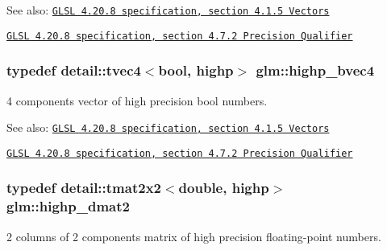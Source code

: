 \begin{Desc}
\item[See also:]\href{http://www.opengl.org/registry/doc/GLSLangSpec.4.20.8.pdf}{\tt GLSL 4.20.8 specification, section 4.1.5 Vectors} 

\href{http://www.opengl.org/registry/doc/GLSLangSpec.4.20.8.pdf}{\tt GLSL 4.20.8 specification, section 4.7.2 Precision Qualifier} \end{Desc}
\hypertarget{group__core__precision_g381539af52c5e5c659700e12fb706eaf}{
\subsubsection[highp\_\-bvec4]{\setlength{\rightskip}{0pt plus 5cm}typedef detail::tvec4$<$bool, highp$>$ {\bf glm::highp\_\-bvec4}}}
\label{group__core__precision_g381539af52c5e5c659700e12fb706eaf}


4 components vector of high precision bool numbers.

\begin{Desc}
\item[See also:]\href{http://www.opengl.org/registry/doc/GLSLangSpec.4.20.8.pdf}{\tt GLSL 4.20.8 specification, section 4.1.5 Vectors} 

\href{http://www.opengl.org/registry/doc/GLSLangSpec.4.20.8.pdf}{\tt GLSL 4.20.8 specification, section 4.7.2 Precision Qualifier} \end{Desc}
\hypertarget{group__core__precision_g9b158b3b722fe991bb66f7e65f136e68}{
\subsubsection[highp\_\-dmat2]{\setlength{\rightskip}{0pt plus 5cm}typedef detail::tmat2x2$<$double, highp$>$ {\bf glm::highp\_\-dmat2}}}
\label{group__core__precision_g9b158b3b722fe991bb66f7e65f136e68}


2 columns of 2 components matrix of high precision floating-point numbers.

